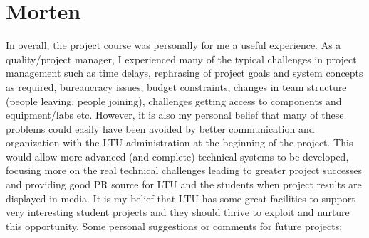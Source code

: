 \section{Morten}
In overall, the project course was personally for me a useful experience. As a quality/project manager, I experienced many of the typical challenges in project management such as time delays, rephrasing of project goals and system concepts as required, bureaucracy issues, budget constraints, changes in team structure (people leaving, people joining), challenges getting access to components and equipment/labs etc. However, it is also my personal belief that many of these problems could easily have been avoided by better communication and organization with the LTU administration at the beginning of the project. This would allow more advanced (and complete) technical systems to be developed, focusing more on the real technical challenges leading to greater project successes and providing good PR source for LTU and the students when project results are displayed in media. It is my belief that LTU has some great facilities to support very interesting student projects and they should thrive to exploit and nurture 
this opportunity.
%
Some personal suggestions or comments for future projects:
